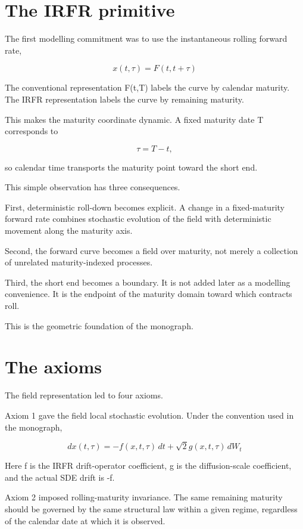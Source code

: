 \documentclass[11pt,oneside]{book}
\begin{document}
\section{The IRFR primitive}\label{the-irfr-primitive-1}

The first modelling commitment was to use the instantaneous rolling
forward rate,

\[
x(t,\tau)=F(t,t+\tau)
\]

The conventional representation F(t,T) labels the curve by calendar
maturity. The IRFR representation labels the curve by remaining
maturity.

This makes the maturity coordinate dynamic. A fixed maturity date T
corresponds to

\[
\tau=T-t,
\]

so calendar time transports the maturity point toward the short end.

This simple observation has three consequences.

First, deterministic roll-down becomes explicit. A change in a
fixed-maturity forward rate combines stochastic evolution of the field
with deterministic movement along the maturity axis.

Second, the forward curve becomes a field over maturity, not merely a
collection of unrelated maturity-indexed processes.

Third, the short end becomes a boundary. It is not added later as a
modelling convenience. It is the endpoint of the maturity domain toward
which contracts roll.

This is the geometric foundation of the monograph.

\section{The axioms}\label{the-axioms}

The field representation led to four axioms.

Axiom 1 gave the field local stochastic evolution. Under the convention
used in the monograph,

\[
dx(t,\tau) = -f(x,t,\tau)\,dt + \sqrt{2} g(x,t,\tau)\,dW_t
\]

Here f is the IRFR drift-operator coefficient, g is the diffusion-scale
coefficient, and the actual SDE drift is -f.

Axiom 2 imposed rolling-maturity invariance. The same remaining maturity
should be governed by the same structural law within a given regime,
regardless of the calendar date at which it is observed.
\end{document}
